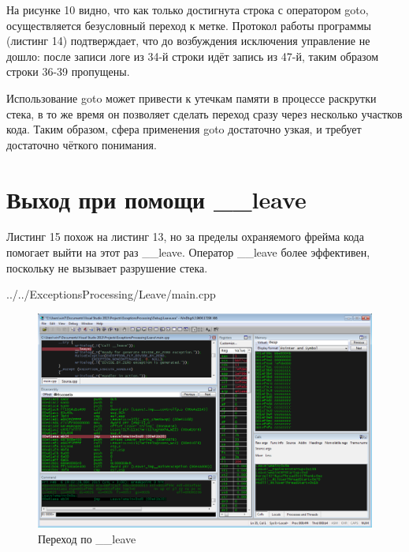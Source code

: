 \documentclass[a4paper, 12pt]{report}		%
\begin{document}
На рисунке 10 видно, что как только достигнута строка с оператором goto, осуществляется безусловный переход к метке. Протокол работы программы (листинг 14) подтверждает, что до возбуждения исключения управление не дошло: после записи  логе из 34-й строки идёт запись из 47-й, таким образом строки 36-39 пропущены.



Использование goto может привести к утечкам памяти в процессе раскрутки стека, в то же время он позволяет сделать переход сразу через несколько участков кода. Таким образом, сфера применения goto достаточно узкая, и требует достаточно чёткого понимания.

\chapter*{Выход при помощи \_\_leave}

Листинг 15 похож на листинг 13, но за пределы охраняемого фрейма кода помогает выйти на этот раз \_\_leave. Оператор \_\_leave более эффективен, поскольку не вызывает разрушение стека.


{../../ExceptionsProcessing/Leave/main.cpp}

\begin{figure}[h!]
\centering
\includegraphics[scale=0.50]{res/011}
\caption{Переход по \_\_leave}
\end{figure}


\end{document}
